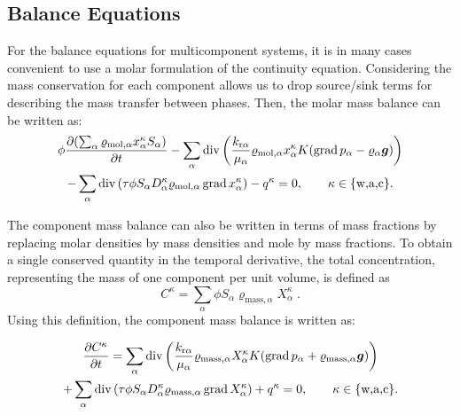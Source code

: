 \subsection{Balance Equations}
For the balance equations for multicomponent systems, it is in many
cases convenient to use a molar formulation of the continuity
equation. Considering the mass conservation for each component allows
us to drop source/sink terms for describing the mass transfer between
phases. Then, the
molar mass balance can be written as:
%
\begin{multline}
  \label{A3:eqmass1}
 \phi \frac{\partial (\sum_\alpha \varrho_{\text{mol}, \alpha}
    x_\alpha^\kappa S_\alpha )}{\partial t}  
 - \sum\limits_\alpha \operatorname{div} \left( \frac{k_{\text{r}
        \alpha}}{\mu_\alpha} \varrho_{\text{mol}, \alpha}
    x_\alpha^\kappa K (\operatorname{grad} p_\alpha -
    \varrho_{\alpha} \boldsymbol{g}) \right)  \\
 - \sum\limits_\alpha \operatorname{div} \left( \tau \phi S_\alpha D_\alpha^\kappa \varrho_{\text{mol},
      \alpha} \operatorname{grad} x_\alpha^\kappa \right)  
 - q^\kappa = 0, \qquad \kappa \in \{\text{w,a,c}\}.
\end{multline}

The component mass balance can also be written in terms of mass fractions 
by replacing molar densities by mass densities and mole by mass fractions.
To obtain a single conserved quantity in the temporal derivative, the total 
concentration, representing the mass of one component per unit volume, is defined as
\begin{displaymath}
C^\kappa = \sum_\alpha \phi S_\alpha \varrho_{\text{mass},\alpha} X_\alpha^\kappa \; .
\end{displaymath}
Using this definition, the component mass balance is written as:

\begin{multline}
  \label{A3:eqmass2}
    \frac{\partial C^\kappa}{\partial t} = 
  \sum\limits_\alpha \operatorname{div} \left( \frac{k_{\text{r}
        \alpha}}{\mu_\alpha} \varrho_{\text{mass}, \alpha}
    X_\alpha^\kappa K (\operatorname{grad} p_\alpha +
    \varrho_{\text{mass}, \alpha} \boldsymbol{g}) \right)  \\
   + \sum\limits_\alpha \operatorname{div} \left( \tau \phi S_\alpha D_\alpha^\kappa \varrho_{\text{mass},
      \alpha} \operatorname{grad} X_\alpha^\kappa \right)  
 + q^\kappa = 0, \qquad \kappa \in \{\text{w,a,c}\}.
\end{multline}


